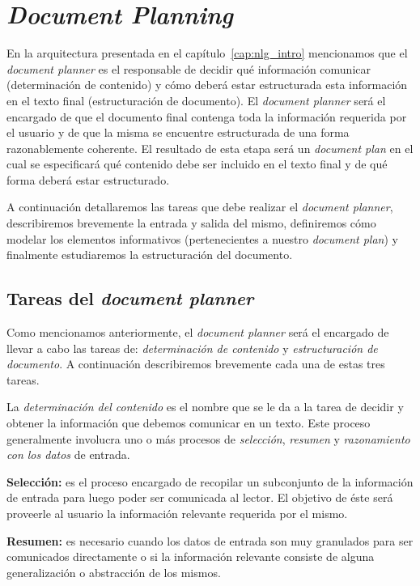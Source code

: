 \chapter{\textit{Document Planning}}
\label{cap:document_planning}

En la arquitectura presentada en el capítulo~\ref{cap:nlg_intro} mencionamos que el \emph{document planner} es el responsable de decidir qué información comunicar (determinación de contenido) y cómo deberá estar estructurada esta información en el texto final (estructuración de documento). El \textit{document planner} será el encargado de que el documento final contenga toda la información requerida por el usuario y de que la misma se encuentre estructurada de una forma razonablemente coherente. El resultado de esta etapa será un \emph{document plan} en el cual se especificará qué contenido debe ser incluido en el texto final y de qué forma deberá estar estructurado.


A continuación detallaremos las tareas que debe realizar el \textit{document planner}, describiremos brevemente la entrada y salida del mismo, definiremos cómo modelar los elementos informativos (pertenecientes a nuestro \emph{document plan}) y finalmente estudiaremos la estructuración del documento.

\section{Tareas del \textit{document planner}}
Como mencionamos anteriormente, el \textit{document planner} será el encargado de llevar a cabo las tareas de: \emph{determinación de contenido} y \emph{estructuración de documento}. A continuación describiremos brevemente cada una de estas tres tareas.

La \emph{determinación del contenido} es el nombre que se le da a la tarea de decidir y obtener la información que debemos comunicar en un texto. Este proceso generalmente involucra uno o más procesos de \emph{selección}, \emph{resumen} y \emph{razonamiento con los datos} de entrada.

\bigskip
\noindent
\textbf{Selección:} es el proceso encargado de recopilar un subconjunto de la información de entrada para luego poder ser comunicada al lector. El objetivo de éste será proveerle al usuario la información relevante requerida por el mismo.

\bigskip
\noindent
\textbf{Resumen:} es necesario cuando los datos de entrada son muy granulados para ser comunicados directamente o si la información relevante consiste de alguna generalización o abstracción de los mismos.

